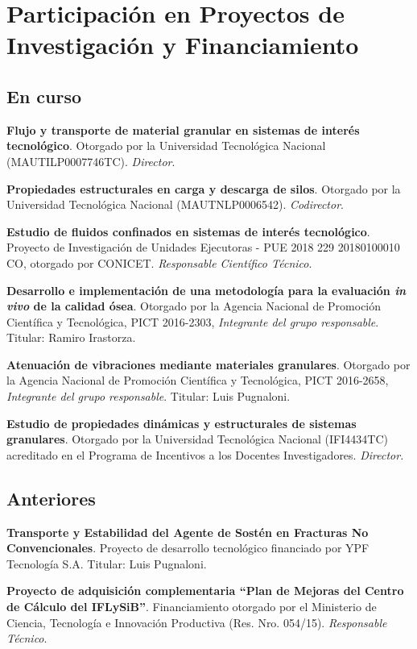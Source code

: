 \section{Participación en Proyectos de Investigación y Financiamiento}
\subsection{En curso}

 \textbf{Flujo y transporte de material granular en sistemas de interés tecnológico}. Otorgado por la Universidad Tecnológica Nacional (MAUTILP0007746TC). \textit{Director}.

 \textbf{Propiedades estructurales en carga y descarga de silos}. Otorgado por la Universidad Tecnológica Nacional (MAUTNLP0006542). \textit{Codirector}.

 \textbf{Estudio de fluidos confinados en sistemas de interés tecnológico}. Proyecto de Investigación de Unidades Ejecutoras - PUE 2018 229 20180100010 CO, otorgado por CONICET. \textit{Responsable Científico Técnico}.

 \textbf{Desarrollo e implementación de una metodología para la evaluación \textit{in vivo} de la calidad ósea}. Otorgado por la Agencia Nacional de Promoción Científica y Tecnológica, PICT 2016-2303, \textit{Integrante del grupo responsable}. Titular: Ramiro Irastorza.

 \textbf{Atenuación de vibraciones mediante materiales granulares}. Otorgado por la Agencia Nacional de Promoción Científica y Tecnológica, PICT 2016-2658, \textit{Integrante del grupo responsable}. Titular: Luis Pugnaloni.

 \textbf{Estudio de propiedades dinámicas y estructurales de sistemas granulares}. Otorgado por la Universidad Tecnológica Nacional (IFI4434TC) acreditado en el Programa de Incentivos a los Docentes Investigadores. \textit{Director.}


\subsection{Anteriores}

 \textbf{Transporte y Estabilidad del Agente de Sostén en Fracturas No Convencionales}. Proyecto de desarrollo tecnológico financiado por YPF Tecnología S.A. Titular: Luis Pugnaloni.

 \textbf{Proyecto de adquisición complementaria ``Plan de Mejoras del Centro de Cálculo del IFLySiB''}. Financiamiento otorgado por el Ministerio de Ciencia, Tecnología e Innovación Productiva (Res. Nro. 054/15). \textit{Responsable Técnico}.

